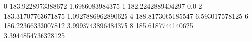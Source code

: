 0 183.9228973388672 1.6986083984375
1 182.2242889404297 0.0
2 183.31707763671875 1.0927886962890625
4 188.8173065185547 6.593017578125
6 186.22366333007812 3.9993743896484375
8 185.6187744140625 3.3944854736328125
